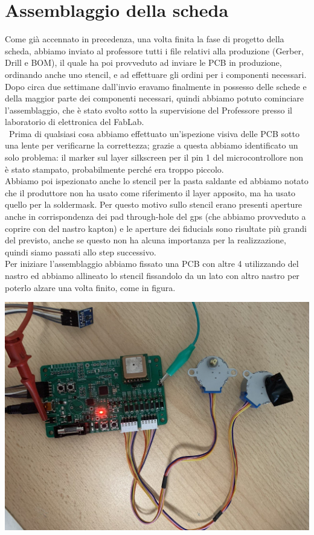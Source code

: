 \chapter{Assemblaggio della scheda}

Come già accennato in precedenza, una volta finita la fase di progetto della scheda, abbiamo inviato al professore tutti i file relativi alla produzione (Gerber, Drill e BOM), il quale ha poi provveduto ad inviare le PCB in produzione, ordinando anche uno stencil, e ad effettuare gli ordini per i componenti necessari.
Dopo circa due settimane dall’invio eravamo finalmente in possesso delle schede e della maggior parte dei componenti necessari, quindi abbiamo potuto cominciare l’assemblaggio, che è stato svolto sotto la supervisione del Professore presso il laboratorio di elettronica del FabLab. \\\
Prima di qualsiasi cosa abbiamo effettuato un’ispezione visiva delle PCB sotto una lente per verificarne la correttezza; grazie a questa abbiamo identificato un solo problema: il marker sul layer silkscreen per il pin 1 del microcontrollore non è stato stampato, probabilmente perché era troppo piccolo. \\
Abbiamo poi ispezionato anche lo stencil per la pasta saldante ed abbiamo notato che il produttore non ha usato come riferimento il layer apposito, ma ha usato quello per la soldermask. Per questo motivo sullo stencil erano presenti aperture anche in corrispondenza dei pad through-hole del gps (che abbiamo provveduto a coprire con del nastro kapton) e le aperture dei fiducials sono risultate più grandi del previsto, anche se questo non ha alcuna importanza per la realizzazione, quindi siamo passati allo step successivo. \\
Per iniziare l’assemblaggio abbiamo fissato una PCB con altre 4 utilizzando del nastro ed abbiamo allineato lo stencil fissandolo da un lato con altro nastro per poterlo alzare una volta finito, come in figura.



\begin{center}
\includegraphics[scale=0.35]{figures/image101.png}
\captionsetup{type=figure}
\end{center}

